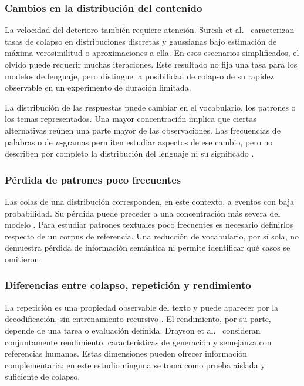 \documentclass[12pt,letterpaper]{article}
\begin{document}
\subsubsection{Cambios en la distribución del contenido}

La velocidad del deterioro también requiere atención. Suresh et al.\
\cite{suresh2025} caracterizan tasas de colapso en distribuciones discretas
y gaussianas bajo estimación de máxima verosimilitud o aproximaciones a ella.
En esos escenarios simplificados, el olvido puede requerir muchas
iteraciones. Este resultado no fija una tasa para los modelos de lenguaje,
pero distingue la posibilidad de colapso de su rapidez observable en un
experimento de duración limitada.

La distribución de las respuestas puede cambiar en el vocabulario, los
patrones o los temas representados. Una mayor concentración implica que
ciertas alternativas reúnen una parte mayor de las observaciones. Las
frecuencias de palabras o de \(n\)-gramas permiten estudiar aspectos de ese
cambio, pero no describen por completo la distribución del lenguaje ni
su significado \cite{zhu2025}.

\subsubsection{Pérdida de patrones poco frecuentes}

Las colas de una distribución corresponden, en este contexto, a eventos
con baja probabilidad. Su pérdida puede preceder a una concentración más
severa del modelo \cite{shumailov2024}. Para estudiar patrones textuales
poco frecuentes es necesario definirlos respecto de un corpus de
referencia. Una reducción de vocabulario, por sí sola, no demuestra pérdida
de información semántica ni permite identificar qué casos se omitieron.

\subsubsection{Diferencias entre colapso, repetición y rendimiento}

La repetición es una propiedad observable del texto y puede aparecer por
la decodificación, sin entrenamiento recursivo \cite{holtzman2020}.
El rendimiento, por su parte, depende de una tarea o evaluación definida.
Drayson et al.\ \cite{drayson2025} consideran conjuntamente rendimiento,
características de generación y semejanza con referencias humanas. Estas
dimensiones pueden ofrecer información complementaria; en este estudio
ninguna se toma como prueba aislada y suficiente de colapso.
\end{document}
